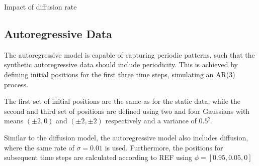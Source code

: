         Impact of diffusion rate
    
    \subsection{Autoregressive Data}
    
        The autoregressive model is capable of capturing periodic patterns, such that the synthetic autoregressive data should include periodicity. This is achieved by defining initial positions for the first three time steps, simulating an AR(3) process. 
        
        The first set of initial positions are the same as for the static data, while the second and third set of positions are defined using two and four Gaussians with means $(\pm2,0)$ and $(\pm2,\pm2)$ respectively and a variance of $0.5^2$.
        
        Similar to the diffusion model, the autoregressive model also includes diffusion, where the same rate of $\sigma=0.01$ is used. Furthermore, the positions for subsequent time steps are calculated according to REF using $\phi=[0.95, 0.05, 0]$